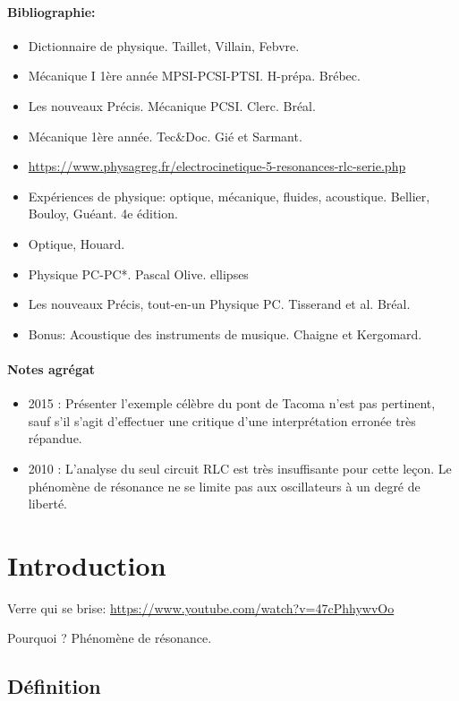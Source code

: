 \documentclass[11pt]{report}
\numberwithin{figure}{section}
\numberwithin{equation}{section}
\numberwithin{table}{section}
\newcommand{\1}{\boldsymbol{1}}
\begin{document}
\paragraph*{Bibliographie:}
\begin{itemize}
\item Dictionnaire de physique. Taillet, Villain, Febvre.
\item Mécanique I 1ère année MPSI-PCSI-PTSI. H-prépa. Brébec.
\item Les nouveaux Précis. Mécanique PCSI. Clerc. Bréal.
\item Mécanique 1ère année. Tec\&Doc. Gié et Sarmant.
\item \url{https://www.physagreg.fr/electrocinetique-5-resonances-rlc-serie.php}
\item Expériences de physique: optique, mécanique, fluides, acoustique. Bellier, Bouloy, Guéant. 4e édition.
\item Optique, Houard.
\item Physique PC-PC*. Pascal Olive. ellipses
\item Les nouveaux Précis, tout-en-un Physique PC. Tisserand et al. Bréal.
\item Bonus: Acoustique des instruments de musique. Chaigne et Kergomard.
\end{itemize}


\paragraph{Notes agrégat}
\begin{itemize}
\item 2015 : Présenter l’exemple célèbre du pont de Tacoma n’est pas pertinent, sauf s’il s’agit d’effectuer une critique d’une interprétation erronée très répandue.
\item 2010 : L’analyse du seul circuit RLC est très insuffisante pour cette leçon. Le phénomène de résonance ne se limite pas aux oscillateurs à un degré de liberté.
\end{itemize}

\section*{Introduction}

Verre qui se brise: \url{https://www.youtube.com/watch?v=47cPhhywvOo}

Pourquoi ? Phénomène de résonance.


\subsection*{Définition}
\end{document}
